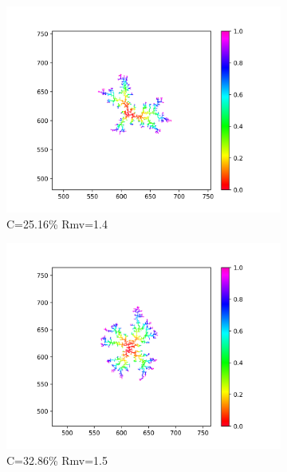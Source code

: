 \documentclass[10pt]{article}
\begin{document}
\begin{figure}[h]
\begin{subfigure}[b]{0.2\textwidth}
		\includegraphics[width=\textwidth]{Figure_10_1.4}
		\caption{C=25.16\% Rmv=1.4}
	\end{subfigure}
	\hfill
	\begin{subfigure}[b]{0.2\textwidth}
		\centering
		\includegraphics[width=\textwidth]{Figure_10_1.5}
		\caption{C=32.86\% Rmv=1.5}
	\end{subfigure}
	\hfill
	\begin{subfigure}[b]{0.2\textwidth}
		\centering

\end{subfigure}
\end{figure}
\end{document}
